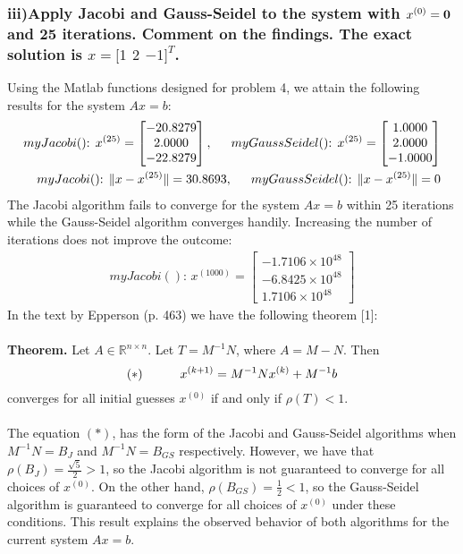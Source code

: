 \documentclass[11pt, letterpaper]{article}
\begin{document}
\subsubsection*{iii)\normalfont Apply Jacobi and Gauss-Seidel to the system with $x^{(0)}={\bf0}$ and 25 iterations.
Comment on the findings. The exact solution is $x=[1$ $2$ $-1]^T$.}
Using the Matlab functions designed for problem 4, we attain the following results for the system $Ax=b$:
\begin{align*}
    \text{$myJacobi()$: }x^{(25)}=
    \begin{bmatrix}
        -20.8279\\
        2.0000\\
        -22.8279
    \end{bmatrix}
    ,\indent \text{$myGaussSeidel()$: }x^{(25)}=
    \begin{bmatrix}
        1.0000\\
        2.0000\\
        -1.0000
    \end{bmatrix}\\
    \text{$myJacobi()$: }\|x-x^{(25)}\|=30.8693
    ,\indent\text{$myGaussSeidel()$: }\|x-x^{(25)}\|=0
\end{align*}
The Jacobi algorithm fails to converge for the system $Ax=b$ within 25 iterations while the Gauss-Seidel 
algorithm converges handily. Increasing the number of iterations does not improve the outcome:
\begin{align*}
    \text{$myJacobi()$: }x^{(1000)}=
    \begin{bmatrix}
        -1.7106\times10^{48}\\
        -6.8425\times10^{48}\\
        1.7106\times10^{48}
    \end{bmatrix}
\end{align*}
In the text by Epperson (p. 463) we have the following theorem [1]:\\\\
{\bf Theorem. }Let  $A\in\mathbb{R}^{n\times n}$. Let $T=M^{-1}N$, where $A=M-N$. Then 
\[(*)\indent\indent x^{(k+1)}=M^{-1}Nx^{(k)}+M^{-1}b\]
converges for all initial guesses $x^{(0)}$ if and only if $\rho(T)<1$.\\\\
The equation $(*)$, has the form of the Jacobi and Gauss-Seidel algorithms when $M^{-1}N=B_J$ and $M^{-1}N=B_{GS}$
respectively. However, we have that $\rho(B_J)=\frac{\sqrt{5}}{2}>1$, so the Jacobi algorithm is not 
guaranteed to converge for all choices of $x^{(0)}$. On the other hand, $\rho(B_{GS})=\frac{1}{2}<1$, so the Gauss-Seidel
algorithm is guaranteed to converge for all choices of $x^{(0)}$ under these conditions. This result
explains the observed behavior of both algorithms for the current system $Ax=b$.
\end{document}
